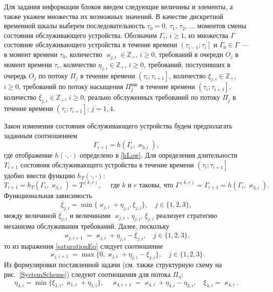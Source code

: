 \documentclass[a4paper,12pt,russian]{extarticle}
\begin{document}
Для задания информации блоков введем следующие величины и элементы, а также укажем множества их возможных значений. В качестве дискретной временной шкалы выберем последовательность $\tau_0=0$, $\tau_1$, $\tau_2$, $\ldots$ моментов смены состояния обслуживающего устройства. Обозначим $\Gamma_i$, $i\geqslant 1$, из множества $\Gamma$ состояние обслуживающего устройства в течение времени $\left(\tau_{i-1};\tau_i\right]$ и $\Gamma_0\in \Gamma$~--- в момент времени $\tau_0$, количество $\varkappa_{j,i} \in \mathbb{Z}_+ $, $i\geqslant 0$, требований в очереди $O_j$ в момент времени $\tau_i$, количество $\eta_{j,i} \in \mathbb{Z}_+$, $i\geqslant 0$, требований, поступивших в очередь $O_j$ по потоку $\Pi_j$ в течение времени $\left(\tau_{i};\tau_{i+1}\right]$, количество $\xi_{j,i} \in \mathbb{Z}_+$, $i\geqslant 0$, требований по потоку насыщения $\Pi^{\mathrm{\text{нас}}}_j$ в течение времени $\left(\tau_{i};\tau_{i+1}\right]$, количество $\overline{\xi}_{j,i}\in \mathbb{Z}_+$, $i\geqslant 0$, реально обслуженных требований по потоку $\Pi_j$ в течение времени $\left(\tau_{i};\tau_{i+1}\right]$; $j=\overline{1,4}$.

Закон изменения состояния обслуживающего устройства будем предполагать заданным соотношением 
\begin{equation}
\Gamma_{i+1}=h(\Gamma_i,\varkappa_{3,i}),
\label{gammaFunc}
\end{equation}
где отображение $h(\cdot,\cdot)$ определено в \eqref{hLaw}.
Для определения длительности $T_{i+1}$ состояния обслуживающего устройства в течение времени $\left(\tau_{i};\tau_{i+1}\right]$ удобно ввести функцию $h_T(\cdot,\cdot)$:
\begin{equation*}
T_{i+1}=h_T(\Gamma_i,\varkappa_{3,i})= T^{(k,r)},\quad  \text{ где $k$ и $r$ таковы, что } \Gamma^{(k,r)}=\Gamma_{i+1}=h(\Gamma_i,\varkappa_{3,i}).
\end{equation*}
Функциональная зависимость
\begin{equation}
\overline{\xi}_{j,i}=\min\{\varkappa_{j,i}+\eta_{j,i},\xi_{j,i}\}, \quad j\in \{1,2,3\},
\label{saturationEq}
\end{equation}
между величиной $\overline{\xi}_{j,i}$ и величинами $\varkappa_{j,i}$, $\eta_{j,i}$, $\xi_{j,i}$ реализует стратегию механизма обслуживания требований. Далее, поскольку 
\begin{equation*}
\varkappa_{j,i+1}=\varkappa_{j,i}+\eta_{j,i}-\overline{\xi}_{j,i}, \quad  j\in \{1,2,3\},
\end{equation*}
то из выражения \eqref{saturationEq} следует соотношение
\begin{equation}
\varkappa_{j,i+1}=\max\{{0,\varkappa_{j,i}+\eta_{j,i}-\xi_{j,i}}\}, \quad j\in \{1,2,3\}.
\label{queuesFunc}
\end{equation}
Из формулировки поставленной задачи (см. также структурную схему на рис.~\ref{SystemScheme}) следуют соотношения для потока $\Pi_4$:
\begin{equation}
\eta_{4,i} = \min\{\xi_{1,i}, \varkappa_{1,i}+\eta_{1,i}\}, \quad \varkappa_{4,i+1}=\varkappa_{4,i}+\eta_{4,i}-\eta_{2,i}, \quad \xi_{4,i} = \varkappa_{4,i}.
\label{FourthFunc}
\end{equation}
\end{document}
